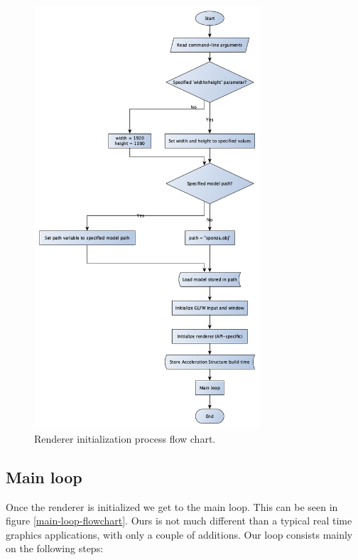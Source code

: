\begin{figure}[hbt!]
  \centering
  \includegraphics[width=0.75\textwidth]{figuras/init-flowchart.png}
  \caption{Renderer initialization process flow chart.}
  \label{init-flowchart}
\end{figure}

\subsection{Main loop}
Once the renderer is initialized we get to the main loop. This can be seen in figure \ref{main-loop-flowchart}. Ours is not much different than a typical real time graphics applications, with only a couple of additions. Our loop consists mainly on the following steps:

